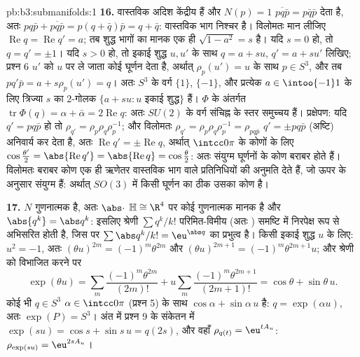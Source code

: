 \begin{solution}{pb:b3:submanifolds:1}
\textbf{16.} वास्तविक अदिश केंद्रीय हैं और $N(p) = 1$ $\overline{pq\bar p} = p\bar q\bar p$ देता है, अतः
$pq\bar p +
\overline{pq\bar p} = p(q + \bar q)\bar p = q + \bar q$: वास्तविक भाग निश्चर है। विलोमतः मान लीजिए $\operatorname{Re}q = \operatorname{Re}q' = a$; तब शुद्ध
भागों का मानक एक ही $\sqrt{1 - a^2} = s$ है। यदि $s =
0$ हो, तो $q = q' = \pm1$। यदि $s > 0$ हो,
तो इकाई शुद्ध $u, u'$ के साथ $q = a + su$, $q' =
a + su'$ लिखिए; प्रश्न 6 $u'$ को
$u$ पर ले जाता कोई घूर्णन देता है, अर्थात् $\rho_p(u') = u$ के साथ $p \in S^3$, और
तब $pq'\bar p = a + s\rho_p(u') =
q$। अतः $S^3$ के वर्ग $\{1\}$, $\{-1\}$, और प्रत्येक $a \in \intoo{-1}1$ के लिए
त्रिज्या $s$ का $2$-गोलक $\{a + su :
u \text{ इकाई शुद्ध}\}$ हैं। $\Phi$ के अंतर्गत $\operatorname{tr}\Phi(q) = \alpha + \bar\alpha =
2\operatorname{Re}q$: अतः
$SU(2)$ के वर्ग संचिह्न के स्तर समुच्चय हैं। प्रक्षेपण: यदि $q' = pq\bar p$ हो
तो $\rho_{q'} = \rho_p\rho_q\rho_p^{-1}$; और विलोमतः
$\rho_{q'} = \rho_p\rho_q\rho_p^{-1} = \rho_{pq\bar p}$
$q' = \pm pq\bar p$ (अष्टि) अनिवार्य कर देता है, अतः $\operatorname{Re}q' = \pm\operatorname{Re}q$, अर्थात् $\intcc0\pi$ के कोणों
के लिए $\cos\frac{\theta'}2 = \abs{\operatorname{Re}q'} =
\abs{\operatorname{Re}q} = \cos\frac\theta2$: अतः संयुग्म घूर्णनों के कोण बराबर होते हैं। विलोमतः
बराबर कोण एक ही ऋणेतर वास्तविक भाग वाले प्रतिनिधियों की अनुमति देते
हैं, जो ऊपर के अनुसार संयुग्म हैं: अर्थात् $SO(3)$ में किसी घूर्णन का
 ठीक उसका कोण है।

\textbf{17.} $N$ गुणनात्मक है, अतः $\abs\cdot$ $\mathbb H \cong \R^4$ पर कोई गुणनात्मक
मानक है और $\abs{q^k} = \abs q^k$: इसलिए श्रेणी $\sum q^k/k!$ परिमित-विमीय (अतः ) समष्टि
में निरपेक्ष रूप से अभिसरित होती है, जिस पर $\sum\abs q^k/k! = \eu^{\abs q}$ का प्रभुत्व है।
किसी इकाई शुद्ध $u$ के लिए: $u^2 = -1$, अतः $(\theta u)^{2m} =
(-1)^m\theta^{2m}$ और $(\theta u)^{2m+1} =
(-1)^m\theta^{2m+1}u$; और श्रेणी
को विभाजित करने पर
\[
\exp(\theta u) = \sum_m\frac{(-1)^m\theta^{2m}}{(2m)!} +
u\sum_m\frac{(-1)^m\theta^{2m+1}}{(2m+1)!} = \cos\theta +
\sin\theta\,u .
\]
कोई भी $q \in S^3$ $\alpha \in \intcc0\pi$ (प्रश्न 5) के साथ $\cos\alpha + \sin\alpha\,u$ है: $q = \exp(\alpha u)$, अतः $\exp(P) = S^3$।
अंत में प्रश्न 9 के संकेतन में $\exp(su) = \cos s + \sin s\,u
= q(2s)$, और वहाँ $\rho_{q(t)} =
\eu^{tA_u}$: $\rho_{\exp(su)} = \eu^{2sA_u}$।


\end{solution}
